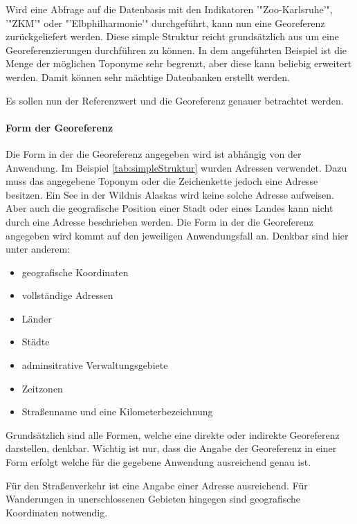 			Wird eine Abfrage auf die Datenbasis mit den Indikatoren '"Zoo-Karlsruhe'", '"ZKM'" oder "'Elbphilharmonie'" durchgeführt, kann nun eine Georeferenz zurückgeliefert werden.
			Diese simple Struktur reicht grundsätzlich aus um eine Georeferenzierungen durchführen zu können.
			In dem angeführten Beispiel ist die Menge der möglichen Toponyme sehr begrenzt, aber diese kann beliebig erweitert werden.
			Damit können sehr mächtige Datenbanken erstellt werden.

			Es sollen nun der Referenzwert und die Georeferenz genauer betrachtet werden.

			\paragraph{Form der Georeferenz}

				Die Form in der die Georeferenz angegeben wird ist abhängig von der Anwendung. 
				Im Beispiel \ref{tab:simpleStruktur} wurden Adressen verwendet. 
				Dazu muss das angegebene Toponym oder die Zeichenkette jedoch eine Adresse besitzen. 
				Ein See in der Wildnis Alaskas wird keine solche Adresse aufweisen.
				Aber auch die geografische Position einer Stadt oder eines Landes kann nicht durch eine Adresse beschrieben werden. 
				Die Form in der die Georeferenz angegeben wird kommt auf den jeweiligen Anwendungsfall an.
				Denkbar sind hier unter anderem:

				\begin{itemize}
				  	 \item geografische Koordinaten
				  	 \item vollständige Adressen
				  	 \item Länder
				  	 \item Städte
				  	 \item adminsitrative Verwaltungsgebiete 
				  	 \item Zeitzonen
				  	 \item Straßenname und eine Kilometerbezeichnung
				  \end{itemize}  

				  Grundsätzlich sind alle Formen, welche eine direkte oder indirekte Georeferenz darstellen, denkbar.
				  Wichtig ist nur, dass die Angabe der Georeferenz in einer Form erfolgt welche für die gegebene Anwendung ausreichend genau ist.

				  Für den Straßenverkehr ist eine Angabe einer Adresse ausreichend.
				  Für Wanderungen in unerschlossenen Gebieten hingegen sind geografische Koordinaten notwendig. 

